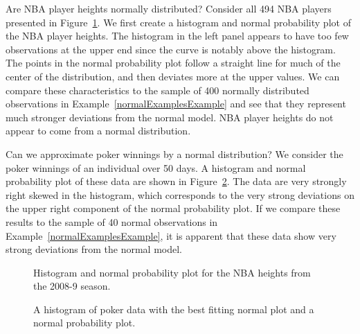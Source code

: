 \begin{examplewrap}
\begin{nexample}{Are NBA player heights normally distributed?
    Consider all 494 NBA players presented in
    Figure~\ref{nbaNormal}.}
  We first create a histogram and normal probability plot
  of the NBA player heights.
  The histogram in the left panel appears to have too few
  observations at the upper end since the curve is notably
  above the histogram.
  The points in the normal probability plot
  follow a straight line for much of the center of the
  distribution, and then deviates more at the upper values.
  We can compare these characteristics to the sample of
  400 normally distributed observations in
  Example~\ref{normalExamplesExample} and see that they
  represent much stronger deviations from the normal model.
  NBA player heights do not appear to come from a normal
  distribution.
\end{nexample}
\end{examplewrap}

\begin{examplewrap}
\begin{nexample}{Can we approximate poker winnings by a normal distribution? We consider the poker winnings of an individual over 50 days. A histogram and normal probability plot of these data are shown in Figure~\ref{pokerNormal}.}
The data are very strongly right skewed in the histogram, which corresponds to the very strong deviations on the upper right component of the normal probability plot. If we compare these results to the sample of 40 normal observations in Example~\ref{normalExamplesExample}, it is apparent that these data show very strong deviations from the normal model.
\end{nexample}
\end{examplewrap}

\begin{figure}
  \centering
  \caption{Histogram and normal probability plot
      for the NBA heights from the 2008-9 season.}
  \label{nbaNormal}
\end{figure}

\begin{figure}
  \centering
  \caption{A histogram of poker data with the best
      fitting normal plot and a normal probability plot.}
  \label{pokerNormal}
\end{figure}

